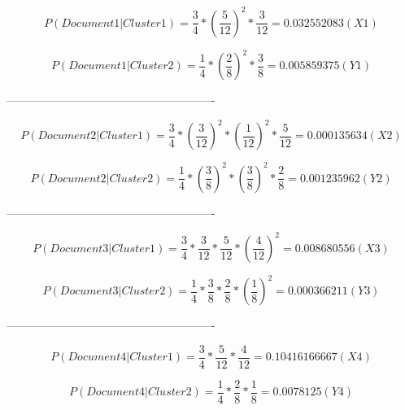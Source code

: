 \begin{boxD}
\begin{equation*}
    P(Document1 | Cluster1) = \frac{3}{4} * (\frac{5}{12}) ^ 2 * \frac{3}{12} = 0.032552083 (X1)
\end{equation*}

\begin{equation*}
    P(Document1 | Cluster2) = \frac{1}{4} * (\frac{2}{8}) ^ 2 * \frac{3}{8} = 0.005859375 (Y1)
\end{equation*}

\begin{center}
    \color{red}
\end{center}

-------------------------------------------------------

\begin{equation*}
    P(Document2 | Cluster1) = \frac{3}{4} * (\frac{3}{12}) ^ 2 * (\frac{1}{12}) ^ 2 * \frac{5}{12} = 0.000135634 (X2)
\end{equation*}

\begin{equation*}
    P(Document2 | Cluster2) = \frac{1}{4} * (\frac{3}{8}) ^ 2 * (\frac{3}{8}) ^ 2 * \frac{2}{8} = 0.001235962 (Y2)
\end{equation*}

\begin{center}
    \color{red}
\end{center}

-------------------------------------------------------

\begin{equation*}
    P(Document3 | Cluster1) = \frac{3}{4} * \frac{3}{12}  * \frac{5}{12} * (\frac{4}{12}) ^ 2 = 0.008680556 (X3)
\end{equation*}

\begin{equation*}
    P(Document3 | Cluster2) = \frac{1}{4} * \frac{3}{8}  * \frac{2}{8} * (\frac{1}{8}) ^ 2 = 0.000366211 (Y3)
\end{equation*}

\begin{center}
    \color{red}
\end{center}

-------------------------------------------------------

\begin{equation*}
    P(Document4 | Cluster1) = \frac{3}{4} * \frac{5}{12} * \frac{4}{12} = 0.10416166667 (X4)
\end{equation*}

\begin{equation*}
    P(Document4 | Cluster2) = \frac{1}{4} * \frac{2}{8} * \frac{1}{8} = 0.0078125 (Y4)
\end{equation*}

\begin{center}
    \color{red}
\end{center}

\end{boxD}

